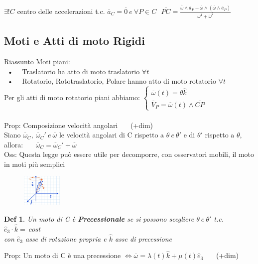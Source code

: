 \documentclass{article}
\theoremstyle{unnumbered}
\newtheorem* {theoremT}{Def}
\theoremstyle{unnumbered1}
\newenvironment{defi}{\begin{gBox}\begin{theoremT}}{\end{theoremT}\end{gBox}}
\begin{document}
$\exists! C$ centro delle accelerazioni t.c. $\overline{a}_C = \overline{0} \ e \ \forall P \in C \ \ \ \overline{PC} = \frac{  \dot{\overline{\omega}}\wedge\overline{a}_P - \overline{\omega}\wedge(\overline{\omega}\wedge\overline{a}_P) }{ \omega^4 + \dot{\omega}^2  } $ \\




\subsection{Moti e Atti di moto Rigidi}
%
%
%
Riassunto Moti piani:\\
\ • \ \ Traslatorio ha atto di moto traslatorio $\forall t$\\
\ • \ \ Rotatorio, Rototraslatorio, Polare hanno atto di moto rotatorio $\forall t$\\
Per gli atti di moto rotatorio piani abbiamo: $\begin{cases}
\overline{\omega}(t)=\dot{\theta}\hat{k} \\
\overline{V}_P=\overline{\omega}(t)\wedge\overline{CP}
\end{cases}$ \\ \\
%
%
%
Prop: Composizione velocità angolari \ \ \ (+dim)\\
\phantom{Prop: }Siano $\overline{\omega}_C, \ \overline{\omega}_C' \ e \ \overline{\omega}$ le velocità angolari di C rispetto a $\theta \ e\ \theta'$ e di $\theta'$ rispetto a $\theta$, allora: \ \ \ $\overline{\omega}_C = \overline{\omega}_C' + \overline{\omega}$ \\
Oss: Questa legge può essere utile per decomporre, con osservatori mobili, il moto in moti più semplici
%
%
%
\begin{figure}
\includegraphics[width=0.17\textwidth]{Processionale.jpeg}
\end{figure}
%
\begin{defi}
Un moto di C è \textbf{Precessionale} se si possono scegliere $\theta \ e\ \theta'$ t.c. $\hat{e}_3\cdot\hat{k} = \ cost$\\
con $\hat{e}_3$ asse di rotazione propria e $\hat{k}$ asse di precessione
\end{defi}
Prop: Un moto di C è una precessione $\Longleftrightarrow \overline{\omega}= \lambda(t)\hat{k}+\mu(t)\hat{e}_3$ \ \ \ (+dim) \\
\phantom{}\\
\phantom{}\\
\phantom{}\\
\newpage
\end{document}
